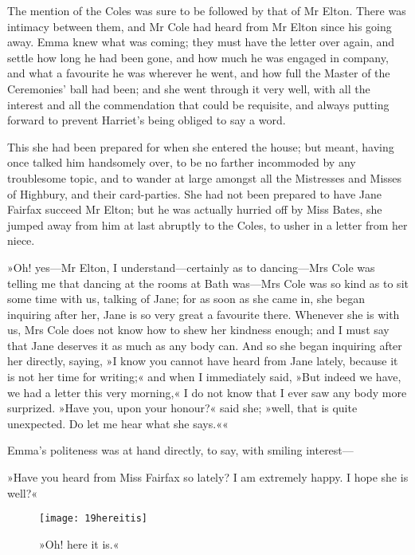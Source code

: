 The mention of the Coles was sure to be followed by that of Mr Elton. There was intimacy between them, and Mr Cole had heard from Mr Elton since his going away. Emma knew what was coming; they must have the letter over again, and settle how long he had been gone, and how much he was engaged in company, and what a favourite he was wherever he went, and how full the Master of the Ceremonies' ball had been; and she went through it very well, with all the interest and all the commendation that could be requisite, and always putting forward to prevent Harriet's being obliged to say a word.

This she had been prepared for when she entered the house; but meant, having once talked him handsomely over, to be no farther incommoded by any troublesome topic, and to wander at large amongst all the Mistresses and Misses of Highbury, and their card-parties. She had not been prepared to have Jane Fairfax succeed Mr Elton; but he was actually hurried off by Miss Bates, she jumped away from him at last abruptly to the Coles, to usher in a letter from her niece.

»Oh! yes—Mr Elton, I understand—certainly as to dancing—Mrs Cole was telling me that dancing at the rooms at Bath was—Mrs Cole was so kind as to sit some time with us, talking of Jane; for as soon as she came in, she began inquiring after her, Jane is so very great a favourite there. Whenever she is with us, Mrs Cole does not know how to shew her kindness enough; and I must say that Jane deserves it as much as any body can. And so she began inquiring after her directly, saying, »I know you cannot have heard from Jane lately, because it is not her time for writing;« and when I immediately said, »But indeed we have, we had a letter this very morning,« I do not know that I ever saw any body more surprized. »Have you, upon your honour?« said she; »well, that is quite unexpected. Do let me hear what she says.««

Emma's politeness was at hand directly, to say, with smiling interest—

»Have you heard from Miss Fairfax so lately? I am extremely happy. I hope she is well?«

\begin{figure}[tbph]
\centering
\texttt{[image: 19hereitis]}
\caption{»Oh! here it is.«}
\end{figure}

